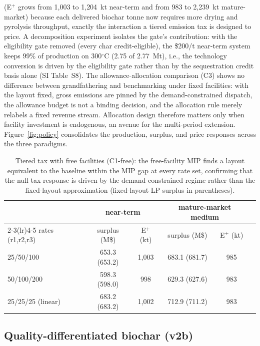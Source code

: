 (E$^{+}$ grows from 1{,}003 to 1{,}204~kt near-term and from 983 to
2{,}239~kt mature-market) because each delivered biochar tonne now requires
more drying and pyrolysis throughput, exactly the interaction a tiered
emission tax is designed to price. A decomposition experiment isolates the
gate's contribution: with the eligibility gate removed (every char
credit-eligible), the \$200/t near-term system keeps 99\% of production on
300$^\circ$C (2.75 of 2.77~Mt), i.e., the technology conversion is driven by
the eligibility gate rather than by the sequestration credit basis alone (SI
Table~S8). The
allowance-allocation comparison (C3) shows no difference between grandfathering
and benchmarking under fixed facilities: with the layout fixed, gross
emissions are pinned by the demand-constrained dispatch, the allowance budget
is not a binding decision, and the allocation rule merely relabels a fixed
revenue stream. Allocation design therefore matters only when facility
investment is endogenous, an avenue for the multi-period extension. Figure~\ref{fig:policy} consolidates the production,
surplus, and price responses across the three paradigms.

\begin{table}[htbp]
\centering
\caption{\small Tiered tax with free facilities (C1-free): the free-facility MIP
finds a layout equivalent to the baseline within the MIP gap at every rate
set, confirming that the
null tax response is driven by the demand-constrained regime rather than the
fixed-layout approximation (fixed-layout LP surplus in parentheses).}
\label{tab:c1free}
\begin{tabular}{lccccc}
\toprule
 & \multicolumn{2}{c}{near-term} & \multicolumn{2}{c}{mature-market medium}\\
\cmidrule(lr){2-3}\cmidrule(lr){4-5}
rates (r1,r2,r3) & surplus (M\$) & E$^{+}$ (kt) & surplus (M\$) & E$^{+}$ (kt)\\
\midrule
25/50/100 & 653.3 (653.2) & 1{,}003 & 683.1 (681.7) & 985\\
50/100/200 & 598.3 (598.0) & 998 & 629.3 (627.6) & 983\\
25/25/25 (linear) & 683.2 (683.2) & 1{,}002 & 712.9 (711.2) & 983\\
\bottomrule
\end{tabular}
\end{table}

\subsection{Quality-differentiated biochar (v2b)}

